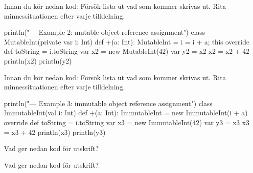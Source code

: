 \Subtask Innan du kör nedan kod: Försök lista ut vad som kommer skrivas ut. Rita minnessituationen efter varje tilldelning.

\begin{Code}
println("\n--- Example 2: mutable object reference assignment")
class MutableInt(private var i: Int) {
  def +(a: Int): MutableInt = { i = i + a; this }
  override def toString = i.toString
}
var x2 = new MutableInt(42)
var y2 = x2
x2 = x2 + 42
println(x2)
println(y2)
\end{Code}

\Subtask Innan du kör nedan kod: Försök lista ut vad som kommer skrivas ut. Rita minnessituationen efter varje tilldelning.

\begin{Code}
println("\n--- Example 3: immutable object reference assignment")
class ImmutableInt(val i: Int) {
  def +(a: Int): ImmutableInt = new ImmutableInt(i + a) 
  override def toString = i.toString
}
var x3 = new ImmutableInt(42)
var y3 = x3
x3 = x3 + 42
println(x3)
println(y3)
\end{Code}

\Subtask Vad ger nedan kod för utskrift?

\Subtask Vad ger nedan kod för utskrift?


\ExtraTasks %

\Task 

\AdvancedTasks %

\Task 